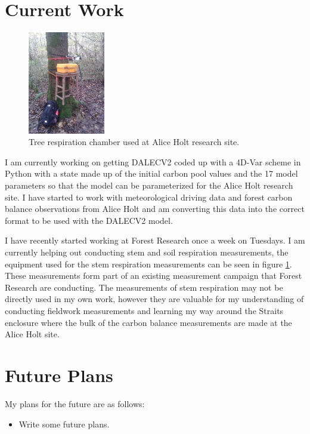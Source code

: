 \documentclass[11pt]{article}
\begin{document}
\section{Current Work}
\begin{figure}
    \includegraphics[width=0.3\textwidth]{treechamber.png}
  \caption{Tree respiration chamber used at Alice Holt research site.}
\label{stem}
\end{figure}
I am currently working on getting DALECV2 coded up with a 4D-Var scheme in Python with a state made up of the initial carbon pool values and the 17 model parameters so that the model can be parameterized for the Alice Holt research site.
I have started to work with meteorological driving data and forest carbon balance observations from Alice Holt and am converting this data into the correct format to be used with the DALECV2 model. 

I have recently started working at Forest Research once a week on Tuesdays. I am currently helping out conducting stem and soil respiration measurements, the equipment used for the stem respiration measurements can be seen in figure \ref{stem}. These measurements form part of an existing measurement campaign that Forest Research are conducting. The measurements of stem respiration may not be directly used in my own work, however they are valuable for my understanding of conducting fieldwork measurements and learning my way around the Straits enclosure where the bulk of the carbon balance measurements are made at the Alice Holt site.

\section{Future Plans}

My plans for the future are as follows:

\begin{itemize}
\item Write some future plans.
\end{itemize}
\end{document}
